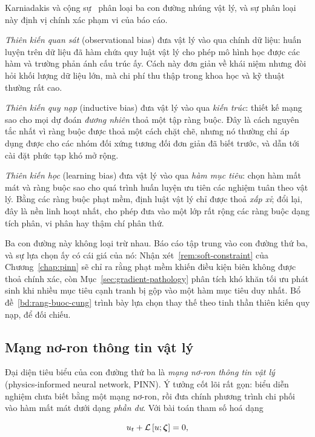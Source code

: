 Karniadakis và cộng sự~\cite{karniadakis2021} phân loại ba con đường nhúng vật lý,
và sự phân loại này định vị chính xác phạm vi của báo cáo.
 
\emph{Thiên kiến quan sát} (observational bias) đưa vật lý vào qua chính dữ liệu:
huấn luyện trên dữ liệu đã hàm chứa quy luật vật lý cho phép mô hình học được các
hàm và trường phản ánh cấu trúc ấy. Cách này đơn giản về khái niệm nhưng đòi hỏi
khối lượng dữ liệu lớn, mà chi phí thu thập trong khoa học và kỹ thuật thường rất
cao.
 
\emph{Thiên kiến quy nạp} (inductive bias) đưa vật lý vào qua \emph{kiến trúc}:
thiết kế mạng sao cho mọi dự đoán \emph{đương nhiên} thoả một tập ràng buộc. Đây
là cách nguyên tắc nhất vì ràng buộc được thoả một cách chặt chẽ, nhưng nó thường
chỉ áp dụng được cho các nhóm đối xứng tương đối đơn giản đã biết trước, và dẫn
tới cài đặt phức tạp khó mở rộng.
 
\emph{Thiên kiến học} (learning bias) đưa vật lý vào qua \emph{hàm mục tiêu}: chọn
hàm mất mát và ràng buộc sao cho quá trình huấn luyện ưu tiên các nghiệm tuân theo
vật lý. Bằng các ràng buộc phạt mềm, định luật vật lý chỉ được thoả \emph{xấp
xỉ}; đổi lại, đây là nền linh hoạt nhất, cho phép đưa vào một lớp rất rộng các
ràng buộc dạng tích phân, vi phân hay thậm chí phân thứ.
 
Ba con đường này không loại trừ nhau. Báo cáo tập trung vào con đường thứ ba, và
sự lựa chọn ấy có cái giá của nó: Nhận xét~\ref{rem:soft-constraint} của
Chương~\ref{chap:pinn} sẽ chỉ ra rằng phạt mềm khiến điều kiện biên không được
thoả chính xác, còn Mục~\ref{sec:gradient-pathology} phân tích khó khăn tối ưu
phát sinh khi nhiều mục tiêu cạnh tranh bị gộp vào một hàm mục tiêu duy nhất.
Bổ đề~\ref{bd:rang-buoc-cung} trình bày lựa chọn thay thế theo tinh thần thiên
kiến quy nạp, để đối chiếu.
 
\subsection{Mạng nơ-ron thông tin vật lý}
 
Đại diện tiêu biểu của con đường thứ ba là \emph{mạng nơ-ron thông tin vật lý}
(physics-informed neural network, PINN). Ý tưởng cốt lõi rất gọn: biểu diễn nghiệm
chưa biết bằng một mạng nơ-ron, rồi đưa chính phương trình chi phối vào hàm mất
mát dưới dạng \emph{phần dư}. Với bài toán tham số hoá dạng

\begin{equation*}
    u_t + \mathcal{L}\left[u; \bm{\zeta}\right] = 0,
\end{equation*}

